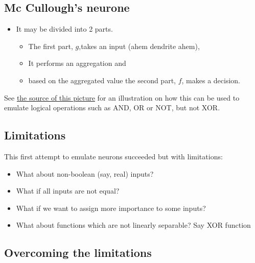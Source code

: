 \documentclass[
  letterpaper,
  DIV=11,
  numbers=noendperiod]{scrartcl}
\providecommand{\tightlist}{%
  \setlength{\itemsep}{0pt}\setlength{\parskip}{0pt}}\usepackage{longtable,booktabs,array}
\begin{document}
\hypertarget{mc-culloughs-neurone-1}{%
\subsection{Mc Cullough's neurone}\label{mc-culloughs-neurone-1}}

\begin{itemize}
\tightlist
\item
  It may be divided into 2 parts.

  \begin{itemize}
  \tightlist
  \item
    The first part, \(g\),takes an input (ahem dendrite ahem),
  \item
    It performs an aggregation and
  \item
    based on the aggregated value the second part, \(f\), makes a
    decision.
  \end{itemize}
\end{itemize}

See
\href{https://towardsdatascience.com/mcculloch-pitts-model-5fdf65ac5dd1}{the
source of this picture} for an illustration on how this can be used to
emulate logical operations such as AND, OR or NOT, but not XOR.

\hypertarget{limitations}{%
\subsection{Limitations}\label{limitations}}

This first attempt to emulate neurons succeeded but with limitations:

\begin{itemize}
\item
  What about non-boolean (say, real) inputs?
\item
  What if all inputs are not equal?
\item
  What if we want to assign more importance to some inputs?
\item
  What about functions which are not linearly separable? Say XOR
  function
\end{itemize}

\hypertarget{overcoming-the-limitations}{%
\subsection{Overcoming the
limitations}\label{overcoming-the-limitations}}
\end{document}

